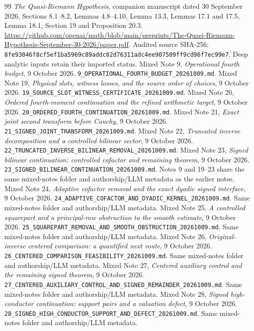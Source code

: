 \documentclass[11pt]{article}
\theoremstyle{definition}
\begin{document}
\begin{thebibliography}{99}
 \emph{The Quasi-Riemann Hypothesis}, companion manuscript dated 30 September 2026, Sections 8.1--8.2, Lemmas 4.8--4.10, Lemma 13.3, Lemmas 17.1 and 17.5, Lemma 18.1, Section 19 and Proposition 20.3. \url{https://github.com/openai/math/blob/main/preprints/The-Quasi-Riemann-Hypothesis-September-30-2026/paper.pdf}. Audited source SHA-256: \nolinkurl{8fe93046f8cf5ef1ba5969c89addc02d76311adc4ee907509ff9cd96f7ec99e7}. Deep analytic inputs retain their imported status.
 Mixed Note 9, \emph{Operational fourth budget}, 9 October 2026. \nolinkurl{9_OPERATIONAL_FOURTH_BUDGET_20261009.md}.
 Mixed Note 19, \emph{Physical slots, witness losses, and the source order of choices}, 9 October 2026. \nolinkurl{19_SOURCE_SLOT_WITNESS_CERTIFICATE_20261009.md}.
 Mixed Note 20, \emph{Ordered fourth-moment continuation and the refined arithmetic target}, 9 October 2026. \nolinkurl{20_ORDERED_FOURTH_CONTINUATION_20261009.md}.
 Mixed Note 21, \emph{Exact joint second transform before Cauchy}, 9 October 2026. \nolinkurl{21_SIGNED_JOINT_TRANSFORM_20261009.md}.
 Mixed Note 22, \emph{Truncated inverse decomposition and a controlled bilinear sector}, 9 October 2026. \nolinkurl{22_TRUNCATED_INVERSE_BILINEAR_REMOVAL_20261009.md}.
 Mixed Note 23, \emph{Signed bilinear continuation: controlled cofactor and remaining theorem}, 9 October 2026. \nolinkurl{23_SIGNED_BILINEAR_CONTINUATION_20261009.md}. Notes 9 and 19--23 share the same mixed-notes folder and authorship/LLM metadata as the earlier notes.
 Mixed Note 24, \emph{Adaptive cofactor removal and the exact dyadic signed interface}, 9 October 2026. \nolinkurl{24_ADAPTIVE_COFACTOR_AND_DYADIC_KERNEL_20261009.md}. Same mixed-notes folder and authorship/LLM metadata.
 Mixed Note 25, \emph{A controlled squarepart and a principal-row obstruction to the smooth estimate}, 9 October 2026. \nolinkurl{25_SQUAREPART_REMOVAL_AND_SMOOTH_OBSTRUCTION_20261009.md}. Same mixed-notes folder and authorship/LLM metadata.
 Mixed Note 26, \emph{Original-inverse centered comparison: a quantified next route}, 9 October 2026. \nolinkurl{26_CENTERED_COMPARISON_FEASIBILITY_20261009.md}. Same mixed-notes folder and authorship/LLM metadata.
 Mixed Note 27, \emph{Centered auxiliary control and the remaining signed theorem}, 9 October 2026. \nolinkurl{27_CENTERED_AUXILIARY_CONTROL_AND_SIGNED_REMAINDER_20261009.md}. Same mixed-notes folder and authorship/LLM metadata.
 Mixed Note 28, \emph{Signed high-conductor continuation: support pairs and a valuation defect}, 9 October 2026. \nolinkurl{28_SIGNED_HIGH_CONDUCTOR_SUPPORT_AND_DEFECT_20261009.md}. Same mixed-notes folder and authorship/LLM metadata.

\end{thebibliography}
\end{document}
